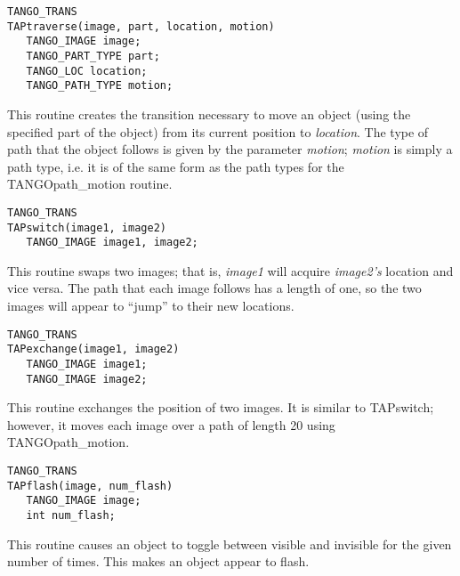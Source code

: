 \vspace{1em}
\begin{verbatim}
TANGO_TRANS
TAPtraverse(image, part, location, motion)
   TANGO_IMAGE image;
   TANGO_PART_TYPE part;
   TANGO_LOC location;
   TANGO_PATH_TYPE motion;
\end{verbatim}
This routine creates the transition necessary to move an object (using the
specified part of the object) from its current position to {\em location}.
The type of path that the object follows is given by the parameter
{\em motion}; {\em motion} is simply a path type, i.e. it is of the same
form as the path types for the TANGOpath\_motion routine.

\vspace{1em}
\begin{verbatim}
TANGO_TRANS
TAPswitch(image1, image2)
   TANGO_IMAGE image1, image2;
\end{verbatim}
This routine swaps two images; that is, {\em image1} will acquire
{\em image2's} location and vice versa.  The path that each image follows
has a length of one, so the two images will appear to ``jump'' to their
new locations.

\vspace{1em}
\begin{verbatim}
TANGO_TRANS
TAPexchange(image1, image2)
   TANGO_IMAGE image1;
   TANGO_IMAGE image2;
\end{verbatim}
This routine exchanges the position of two images.  It is similar to TAPswitch;
however, it moves each image over a path of length 20 using TANGOpath\_motion.

\vspace{1em}
\begin{verbatim}
TANGO_TRANS
TAPflash(image, num_flash)
   TANGO_IMAGE image;
   int num_flash;
\end{verbatim}
This routine causes an object to toggle between visible and invisible for the
given number of times.  This makes an object appear to flash.





